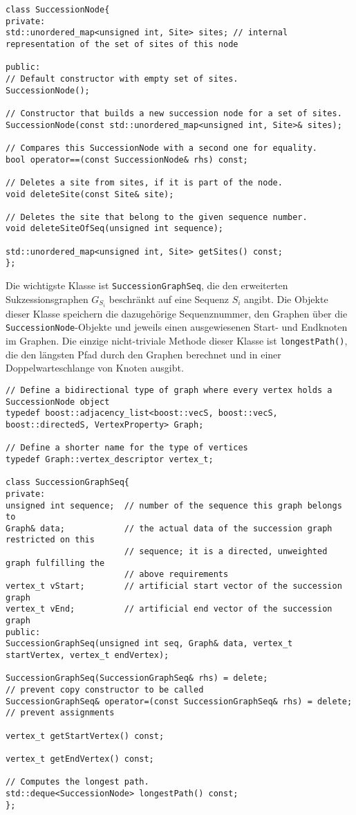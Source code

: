\begin{verbatim}
class SuccessionNode{
private:
std::unordered_map<unsigned int, Site> sites; // internal representation of the set of sites of this node

public:
// Default constructor with empty set of sites.
SuccessionNode();

// Constructor that builds a new succession node for a set of sites.
SuccessionNode(const std::unordered_map<unsigned int, Site>& sites);

// Compares this SuccessionNode with a second one for equality.
bool operator==(const SuccessionNode& rhs) const;

// Deletes a site from sites, if it is part of the node.
void deleteSite(const Site& site);

// Deletes the site that belong to the given sequence number.
void deleteSiteOfSeq(unsigned int sequence);

std::unordered_map<unsigned int, Site> getSites() const;
};
\end{verbatim}

Die wichtigste Klasse ist \texttt{SuccessionGraphSeq}, die den erweiterten Sukzessionsgraphen $G_{S_i}$ beschränkt auf eine Sequenz $S_i$ angibt. Die Objekte dieser Klasse speichern die dazugehörige Sequenznummer, den Graphen über die \texttt{SuccessionNode}-Objekte und jeweils einen ausgewiesenen Start- und Endknoten im Graphen. Die einzige nicht-triviale Methode dieser Klasse ist \texttt{longestPath()}, die den längsten Pfad durch den Graphen berechnet und in einer Doppelwarteschlange von Knoten ausgibt.

\begin{verbatim}
// Define a bidirectional type of graph where every vertex holds a SuccessionNode object
typedef boost::adjacency_list<boost::vecS, boost::vecS, boost::directedS, VertexProperty> Graph;

// Define a shorter name for the type of vertices
typedef Graph::vertex_descriptor vertex_t;

class SuccessionGraphSeq{
private:
unsigned int sequence;  // number of the sequence this graph belongs to
Graph& data;            // the actual data of the succession graph restricted on this 
						// sequence; it is a directed, unweighted graph fulfilling the 
						// above requirements
vertex_t vStart;        // artificial start vector of the succession graph
vertex_t vEnd;          // artificial end vector of the succession graph
public:
SuccessionGraphSeq(unsigned int seq, Graph& data, vertex_t startVertex, vertex_t endVertex);

SuccessionGraphSeq(SuccessionGraphSeq& rhs) = delete;                    // prevent copy constructor to be called
SuccessionGraphSeq& operator=(const SuccessionGraphSeq& rhs) = delete;   // prevent assignments

vertex_t getStartVertex() const;

vertex_t getEndVertex() const;

// Computes the longest path.
std::deque<SuccessionNode> longestPath() const;
};
\end{verbatim}

